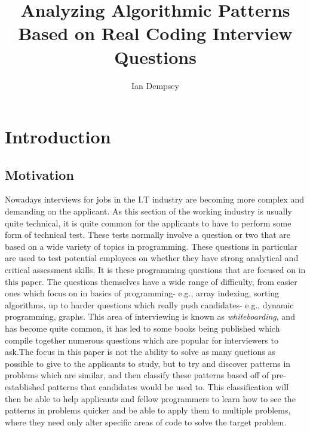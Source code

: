 \documentclass[10pt,twocolumn]{IEEEtran}
\title{Analyzing Algorithmic Patterns Based on Real Coding Interview Questions}
\author{Ian Dempsey}
\begin{document}
\maketitle
{}
\newpage
{}
\section{Introduction}
\subsection{Motivation}
Nowadays interviews for jobs in the I.T industry are becoming more complex and demanding on the applicant. As this section of the working industry is usually quite technical, it is quite common for the applicants to have to perform some form of technical test. These tests normally involve a question or two that are based on a wide variety of topics in programming. These questions in particular are used to test potential employees on whether they have strong analytical and critical assessment skills. It is these programming questions that are focused on in this paper. The questions themselves have a wide range of difficulty, from easier ones which focus on in basics of programming- e.g., array indexing, sorting algorithms, up to harder questions which really push candidates- e.g., dynamic programming, graphs. This area of interviewing is known as \textit{whiteboarding}, and has become quite common, it has led to some books being published which compile together numerous questions which are popular for interviewers to ask\cite{mcdowell2015cracking}.The focus in this paper is not the ability to solve as many quetions as possible to give to the applicants to study, but to try and discover patterns in problems which are similar, and then classify these patterns based off of pre-established patterns that candidates would be used to. This classification will then be able to help applicants and fellow programmers to learn how to see the patterns in problems quicker and be able to apply them to multiple problems, where they need only alter specific areas of code to solve the target problem. 
\end{document}
